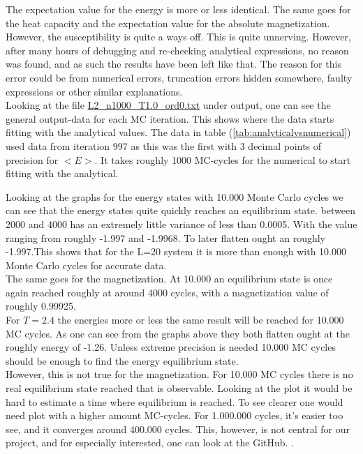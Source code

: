 \documentclass{article}
\begin{document}
The expectation value for the energy is more or less identical. The same goes for the heat capacity and the expectation value for the absolute magnetization.\\

However, the susceptibility is quite a ways off.
This is quite unnerving. However, after many hours of debugging and re-checking analytical expressions, no reason was found, and as such the results have been left like that. The reason for this error could be from numerical errors, truncation errors hidden somewhere, faulty expressions or other similar explanations.\\

Looking at the file  \href{https://github.com/Erikbgram/Fys3150/blob/master/Project\%204/program/output/L2_n1000_T1.0_ord0.txt}{L2\_n1000\_T1.0\_ord0.txt} under output, one can see the general output-data for each MC iteration. This shows where the data starts fitting with the analytical values. The data in table (\ref{tab:analyticalvsnumerical}) used data from iteration 997 as this was the first with 3 decimal points of precision for $<E>$. It takes roughly 1000 MC-cycles for the numerical to start fitting with the analytical.

Looking at the graphs for the energy states with 10.000 Monte Carlo cycles we can see that the energy states quite quickly reaches an equilibrium state. between 2000 and 4000 has an extremely little variance of less than 0.0005. With the value ranging from roughly -1.997 and -1.9968. To later flatten ought an roughly -1.997.This shows that for the L=20 system it is more than enough with 10.000 Monte Carlo cycles for accurate data. \\

The same goes for the magnetization. At 10.000 an equilibrium state is once again reached roughly at around 4000 cycles, with a magnetization value of roughly 0.99925. \\

For $T=2.4$ the energies more or less the same result will be reached for 10.000 MC cycles. As one can see from the graphs above they both flatten ought at the roughly energy of -1.26. Unless extreme precision is needed 10.000 MC cycles should be enough to find the energy equilibrium state. \\

However, this is not true for the magnetization. For 10.000 MC cycles there is no real equilibrium state reached that is observable. Looking at the plot it would be hard to estimate a time where equilibrium is reached. To see clearer one would need plot with a higher amount MC-cycles. For 1.000.000 cycles, it's easier too see, and it converges around 400.000 cycles. This, however, is not central for our project, and for especially interested, one can look at the GitHub. \cite{github}. \\
\end{document}
